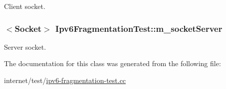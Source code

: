 Client socket. 

\subsubsection[{\texorpdfstring{m\+\_\+socket\+Server}{m_socketServer}}]{$<${\bf Socket}$>$ Ipv6\+Fragmentation\+Test\+::m\+\_\+socket\+Server\hspace{0.3cm}{\ttfamily [private]}}\hypertarget{classIpv6FragmentationTest_a826cfa2a3fcb43dac98cbd8cdc69b151}{}\label{classIpv6FragmentationTest_a826cfa2a3fcb43dac98cbd8cdc69b151}


Server socket. 



The documentation for this class was generated from the following file\+:\begin{DoxyCompactItemize}
\item 
internet/test/\hyperlink{ipv6-fragmentation-test_8cc}{ipv6-\/fragmentation-\/test.\+cc}\end{DoxyCompactItemize}
